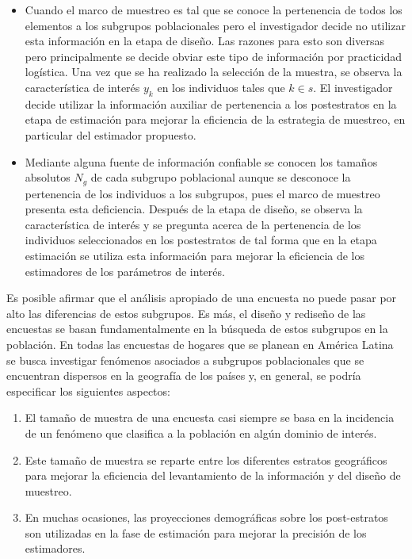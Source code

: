 \documentclass[
  10pt,
  spanish,
]{book}
\providecommand{\tightlist}{%
  \setlength{\itemsep}{0pt}\setlength{\parskip}{0pt}}
\begin{document}
\begin{itemize}
  \begin{itemize}
  \tightlist
  \item
    Cuando el marco de muestreo es tal que se conoce la pertenencia de todos los elementos a los subgrupos poblacionales pero el investigador decide no utilizar esta información en la etapa de diseño. Las razones para esto son diversas pero principalmente se decide obviar este tipo de información por practicidad logística. Una vez que se ha realizado la selección de la muestra, se observa la característica de interés \(y_k\) en los individuos tales que \(k \in s\). El investigador decide utilizar la información auxiliar de pertenencia a los postestratos en la etapa de estimación para mejorar la eficiencia de la estrategia de muestreo, en particular del estimador propuesto.
  \item
    Mediante alguna fuente de información confiable se conocen los tamaños absolutos \(N_g\) de cada subgrupo poblacional aunque se desconoce la pertenencia de los individuos a los subgrupos, pues el marco de muestreo presenta esta deficiencia. Después de la etapa de diseño, se observa la característica de interés y se pregunta acerca de la pertenencia de los individuos seleccionados en los postestratos de tal forma que en la etapa estimación se utiliza esta información para mejorar la eficiencia de los estimadores de los parámetros de interés.
  \end{itemize}
\end{itemize}

Es posible afirmar que el análisis apropiado de una encuesta no puede pasar por alto las diferencias de estos subgrupos. Es más, el diseño y rediseño de las encuestas se basan fundamentalmente en la búsqueda de estos subgrupos en la población. En todas las encuestas de hogares que se planean en América Latina se busca investigar fenómenos asociados a subgrupos poblacionales que se encuentran dispersos en la geografía de los países y, en general, se podría especificar los siguientes aspectos:

\begin{enumerate}
\def\labelenumi{\arabic{enumi}.}
\tightlist
\item
  El tamaño de muestra de una encuesta casi siempre se basa en la incidencia de un fenómeno que clasifica a la población en algún dominio de interés.
\item
  Este tamaño de muestra se reparte entre los diferentes estratos geográficos para mejorar la eficiencia del levantamiento de la información y del diseño de muestreo.
\item
  En muchas ocasiones, las proyecciones demográficas sobre los post-estratos son utilizadas en la fase de estimación para mejorar la precisión de los estimadores.
\end{enumerate}
\end{document}
